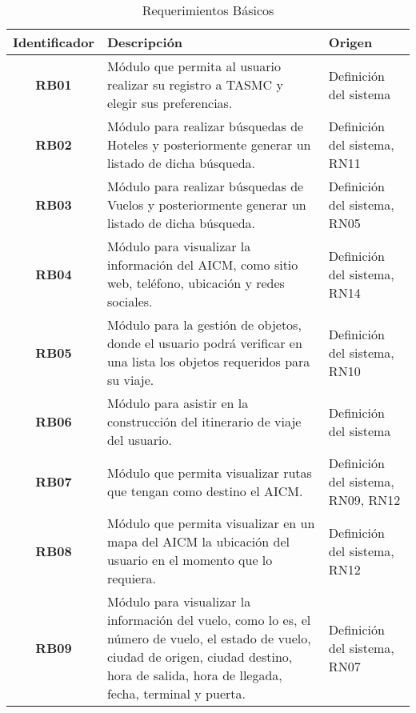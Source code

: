 \begin{table}
	\begin{center}
		\begin{tabular}{|c|p{8.4cm}|p{2.5cm}|}
			\hline \rowcolor[RGB]{0,102,204} 
				\textcolor{blanco}{\bf Identificador} &
				\textcolor{blanco}{\bf Descripción} &
				\textcolor{blanco}{\bf Origen} \\
			\hline \rowcolor[RGB]{224,224,224} 
				\textbf{RB01} &
				Módulo que permita al usuario realizar su registro a TASMC y elegir sus preferencias. &
				Definición del sistema  \\
      		\hline 
      			\textbf{RB02} &
				Módulo para realizar búsquedas de Hoteles y posteriormente generar un listado de dicha búsqueda. &
				Definición del sistema, RN11 \\
			\hline \rowcolor[RGB]{224,224,224} 
				\textbf{RB03} &
				Módulo para realizar búsquedas de Vuelos y posteriormente generar un listado de dicha búsqueda. &
				Definición del sistema, RN05 \\ 
			\hline
				\textbf{RB04} &
				Módulo para visualizar la información del AICM, como sitio web, teléfono, ubicación y redes sociales. &
				Definición del sistema, RN14 \\ 
			\hline \rowcolor[RGB]{224,224,224} 
				\textbf{RB05} &
				Módulo para la gestión de objetos, donde el usuario podrá verificar en una lista los objetos requeridos para su viaje. &
				Definición del sistema, RN10 \\ 
			\hline
				\textbf{RB06} &
				Módulo para asistir en la construcción del itinerario de viaje del usuario. &
				Definición del sistema \\ 
			\hline \rowcolor[RGB]{224,224,224} 
				\textbf{RB07} &
				Módulo que permita visualizar rutas que tengan como destino el AICM. &
				Definición del sistema, RN09, RN12 \\ 
			\hline
				\textbf{RB08} &
				Módulo que permita visualizar en un mapa del AICM la ubicación del usuario en el momento que lo requiera. &
				Definición del sistema, RN12 \\ 
			\hline \rowcolor[RGB]{224,224,224} 
				\textbf{RB09} &
				Módulo para visualizar la información del vuelo, como lo es, el número de vuelo, el estado de vuelo, ciudad de origen, ciudad destino, hora de salida, hora de llegada, fecha, terminal y puerta. &
				Definición del sistema, RN07 \\ 
			\hline 
		\end{tabular}
	\end{center}
	\caption[Requerimientos Básicos]{Requerimientos Básicos} 
	\label{tab:reqBasicos}
\end{table}

